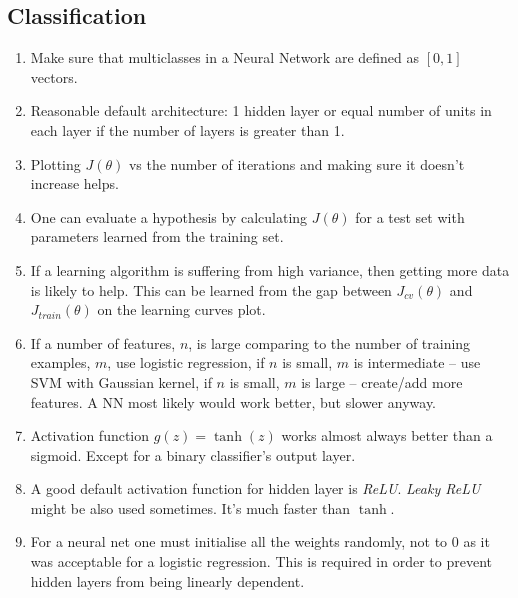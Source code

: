 \documentclass[a4paper,11pt]{article}
\begin{document}
\subsection{Classification}
\begin{enumerate}
\item Make sure that multiclasses in a Neural Network are defined as \textcolor{OliveGreen}{$\left[0, 1 \right]$} vectors.
\item Reasonable default architecture: 1 hidden layer or equal number of units in each layer if the number of layers is greater than 1.
\item Plotting \textcolor{OliveGreen}{$J \left( \theta \right)$} vs the number of iterations and making sure it doesn't increase helps.
\item One can evaluate a hypothesis by calculating \textcolor{OliveGreen}{$J \left( \theta \right)$} for a test set with parameters learned from the training set.
\item If a learning algorithm is suffering from high variance, then getting more data is likely to help. This can be learned from the gap between \textcolor{OliveGreen}{$J_{cv} \left( \theta \right)$} and \textcolor{OliveGreen}{$J_{train} \left( \theta \right)$} on the learning curves plot.
\item If a number of features, \textcolor{OliveGreen}{$n$}, is large comparing to the number of training examples, \textcolor{OliveGreen}{$m$}, use logistic regression, if \textcolor{OliveGreen}{$n$} is small, \textcolor{OliveGreen}{$m$} is intermediate -- use SVM with Gaussian kernel, if \textcolor{OliveGreen}{$n$} is small, \textcolor{OliveGreen}{$m$} is large -- create/add more features. A NN most likely would work better, but slower anyway.
\item Activation function \textcolor{OliveGreen}{$g(z) = \tanh (z)$} works almost always better than a sigmoid. Except for a binary classifier's output layer.
\item A good default activation function for hidden layer is \textit{ReLU}. \textit{Leaky ReLU} might be also used sometimes. It's much faster than \textcolor{OliveGreen}{$\tanh$}.
\item For a neural net one must initialise all the weights randomly, not to \textcolor{OliveGreen}{$0$} as it was acceptable for a logistic regression. This is required in order to prevent hidden layers from being linearly dependent.
\end{enumerate}
\end{document}
